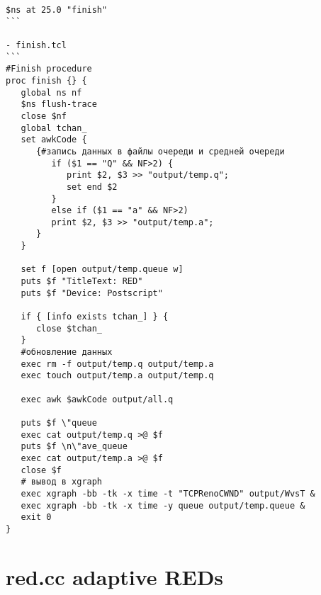 \begin{verbatim}
$ns at 25.0 "finish"
```

- finish.tcl
```
#Finish procedure
proc finish {} {
   global ns nf
   $ns flush-trace
   close $nf
   global tchan_
   set awkCode {  
      {#запись данных в файлы очереди и средней очереди
         if ($1 == "Q" && NF>2) {
            print $2, $3 >> "output/temp.q";
            set end $2
         }
         else if ($1 == "a" && NF>2)
         print $2, $3 >> "output/temp.a";
      }
   }

   set f [open output/temp.queue w]
   puts $f "TitleText: RED"
   puts $f "Device: Postscript"

   if { [info exists tchan_] } {
      close $tchan_
   }
   #обновление данных
   exec rm -f output/temp.q output/temp.a
   exec touch output/temp.a output/temp.q

   exec awk $awkCode output/all.q

   puts $f \"queue
   exec cat output/temp.q >@ $f
   puts $f \n\"ave_queue
   exec cat output/temp.a >@ $f
   close $f
   # вывод в xgraph
   exec xgraph -bb -tk -x time -t "TCPRenoCWND" output/WvsT &
   exec xgraph -bb -tk -x time -y queue output/temp.queue &
   exit 0
}
\end{verbatim}


\section*{red.cc adaptive REDs}

